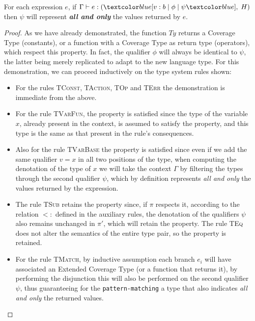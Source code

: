 \begin{theorem}
    For each expression $e$, if $\Gamma \vdash e : (\under{v: b \;|\; \phi \;|\; \psi}, \;H)$ then $\psi$ will represent \textbf{\emph{all and only}} the values returned by $e$.
\end{theorem}

\begin{proof}
    As we have already demonstrated, the function $Ty$ returns a Coverage Type (constants), or a function with a Coverage Type as return type (operators), which respect this property. In fact, the qualifier $\phi$ will always be identical to $\psi$, the latter being merely replicated to adapt to the new language type.
    For this demonstration, we can proceed inductively on the type system rules shown:
    \begin{itemize}
        \item For the rules \textsc{TConst}, \textsc{TAction}, \textsc{TOp} and \textsc{TErr} the demonstration is immediate from the above.
        \item For the rule \textsc{TVarFun}, the property is satisfied since the type of the variable $x$, already present in the context, is assumed to satisfy the property, and this type is the same as that present in the rule's consequences.
        \item Also for the rule \textsc{TVarBase} the property is satisfied since even if we add the same qualifier $v = x$ in all two positions of the type, when computing the denotation of the type of $x$ we will take the context $\Gamma$ by filtering the types through the second qualifier $\psi$, which by definition represents \emph{all and only} the values returned by the expression.
        \item The rule \textsc{TSub} retains the property since, if $\pi$ respects it, according to the relation $<:$ defined in the auxiliary rules, the denotation of the qualifiers $\psi$ also remains unchanged in $\pi'$, which will retain the property. The rule \textsc{TEq} does not alter the semantics of the entire type pair, so the property is retained.
        \item For the rule \textsc{TMatch}, by inductive assumption each branch $e_i$ will have associated an Extended Coverage Type (or a function that returns it), by performing the disjunction this will also be performed on the second qualifier $\psi$, thus guaranteeing for the \verb|pattern-matching| a type that also indicates \emph{all and only} the returned values.

\end{itemize}
\end{proof}
